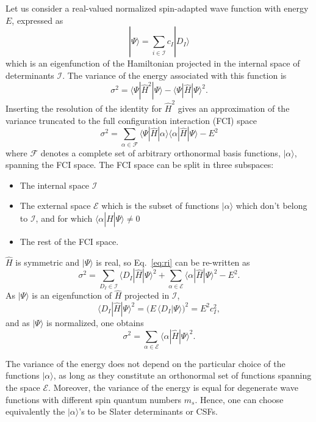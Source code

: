 \documentclass[aip,jcp,reprint,showkeys]{revtex4-1}
\newcommand{\ket}[1]{|#1\rangle}
\newcommand{\csf}{CSF}
\newcommand{\mel}[3]{\langle #1 | #2 | #3 \rangle}
\begin{document}
Let us consider a real-valued normalized spin-adapted wave function with
energy $E$, expressed as
\begin{equation}
\ket{\Psi} = \sum_{i \in \mathcal{I}} c_I \ket{D_I}
\end{equation}
which is an eigenfunction of the Hamiltonian projected in the internal space of
determinants $\mathcal{I}$.
The variance of the energy associated with this function is
\begin{equation}
\sigma^2 = \mel{\Psi}{\hat{H}^2}{\Psi} - \mel{\Psi}{\hat{H}}{\Psi}^2 .
\end{equation}
Inserting the resolution of the identity for $\hat{H}^2$ gives an
approximation of the variance truncated to the full configuration interaction (FCI) space
\begin{equation}
\sigma^2 = \sum_{\alpha \in \mathcal{F}} \mel{\Psi}{\hat{H}}{\alpha} \mel{\alpha}{\hat{H}}{\Psi} - E^2
\label{eq:ri}
\end{equation}
where $\mathcal{F}$ denotes a complete set of arbitrary orthonormal basis
functions, $\ket{\alpha}$, spanning the FCI space.
The FCI space can be split in three subspaces:
\begin{itemize}
\item The internal space $\mathcal{I}$
\item The external space $\mathcal{E}$ which is the subset of functions
      $\ket{\alpha}$ which don't belong to $\mathcal{I}$, and for which
      $\mel{\alpha}{\hat{H}}{\Psi} \ne 0$
\item The rest of the FCI space.
\end{itemize}
$\hat{H}$ is symmetric and $\ket{\Psi}$ is real, so Eq.~\eqref{eq:ri} can be
re-written as
\begin{equation}
\sigma^2 = \sum_{D_I    \in \mathcal{I}} \mel{D_I}{\hat{H}}{\Psi}^2 
         + \sum_{\alpha \in \mathcal{E}} \mel{\alpha}{\hat{H}}{\Psi}^2 - E^2.
\end{equation}
As $\ket{\Psi}$ is an eigenfunction of $\hat{H}$ projected in $\mathcal{I}$, 
\begin{equation}
\mel{D_I}{\hat{H}}{\Psi}^2 = \big( E\, \langle D_I | \Psi \rangle \big)^2 = E^2 c_I^2,
\end{equation}
and as $\ket{\Psi}$ is normalized, one obtains
\begin{equation}
\sigma^2 = \sum_{\alpha \in \mathcal{E}} \mel{\alpha}{\hat{H}}{\Psi}^2.
\end{equation} 

The variance of the energy does not depend on the particular choice of the
functions $\ket{\alpha}$, as long as they constitute an orthonormal set of
functions spanning the space $\mathcal{E}$. Moreover, the variance of the
energy is equal for degenerate wave functions with different spin quantum
numbers $m_s$.  Hence, one can choose equivalently the $\ket{\alpha}$'s to be
Slater determinants or {\csf s}.
\end{document}
